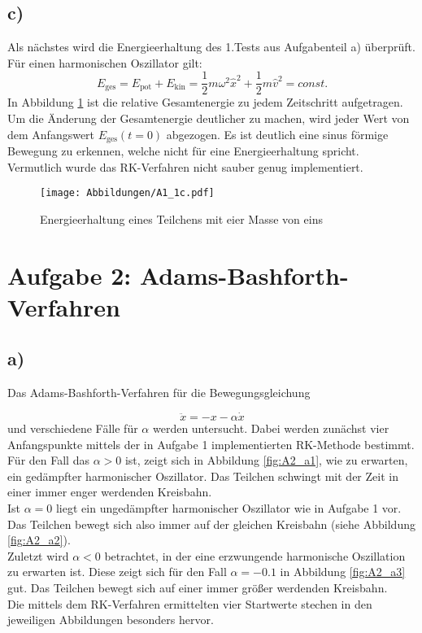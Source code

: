 \subsection*{c)}
Als nächstes wird die Energieerhaltung des 1.Tests aus Aufgabenteil a) überprüft.
Für einen harmonischen Oszillator gilt:
\begin{equation}
  E_{\text{ges}} = E_{\text{pot}} + E_{\text{kin}}
  = \frac{1}{2} m \omega^{2} \hat{x}^{2} + \frac{1}{2} m \hat{v}^{2}
  = const.
\end{equation}
\noindent
In Abbildung \ref{fig:A1_1c} ist die relative Gesamtenergie zu jedem Zeitschritt aufgetragen.
Um die Änderung der Gesamtenergie deutlicher zu machen, wird jeder Wert
von dem Anfangswert $E_{\text{ges}}(t=0)$ abgezogen. Es ist deutlich eine sinus förmige Bewegung zu erkennen, welche nicht für eine Energieerhaltung spricht.
Vermutlich wurde das RK-Verfahren nicht sauber genug implementiert.

\begin{figure}[H]
    \centering
    \texttt{[image: Abbildungen/A1\_1c.pdf]}
    \caption{Energieerhaltung eines Teilchens mit eier Masse von eins}
    \label{fig:A1_1c}
\end{figure}

\section*{Aufgabe 2: Adams-Bashforth-Verfahren}
\subsection*{a)}
Das Adams-Bashforth-Verfahren für die Bewegungsgleichung

\begin{equation*}
  \ddot{x}=-x-\alpha \dot{x}
\end{equation*}
\noindent und verschiedene Fälle für $\alpha$ werden untersucht. Dabei werden
zunächst vier Anfangspunkte mittels der in Aufgabe 1 implementierten RK-Methode
bestimmt.\\
Für den Fall das $\alpha > 0$ ist, zeigt sich in Abbildung \ref{fig:A2_a1}, wie zu erwarten, ein gedämpfter harmonischer Oszillator. Das Teilchen schwingt mit der Zeit in einer immer enger werdenden Kreisbahn.\\
Ist $\alpha = 0$ liegt ein ungedämpfter harmonischer Oszillator wie in Aufgabe 1 vor. Das Teilchen bewegt sich also immer auf der gleichen Kreisbahn (siehe Abbildung \ref{fig:A2_a2}).\\
Zuletzt wird $\alpha < 0$ betrachtet, in der eine erzwungende harmonische Oszillation zu erwarten ist. Diese zeigt sich für den Fall $\alpha = -0.1$ in
Abbildung \ref{fig:A2_a3} gut. Das Teilchen bewegt sich auf einer immer größer werdenden Kreisbahn.\\
Die mittels dem RK-Verfahren ermittelten vier Startwerte stechen in den jeweiligen Abbildungen besonders hervor.


